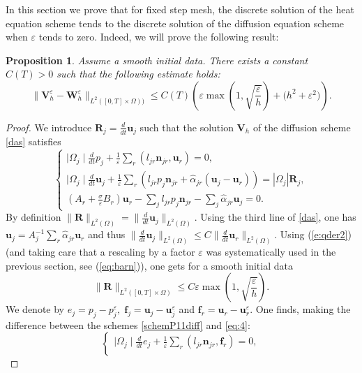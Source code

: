 \documentclass[a4paper,french,english,10pt]{article}
\newcommand\ljr{l_{jr}}
\newcommand\njr{\mathbf{n}_{jr}}
\newcommand\uu{\mathbf{u}}
\newcommand\si{\sigma}
\newcommand\eps{\varepsilon}
\newcommand{\ds}{\displaystyle}
\newcommand\alj{\widehat{\alpha}_{jr}}
\newcommand\uj{\uu_j}
\newcommand\ur{\uu_r}
\newcommand\fj{\mathbf{f}_j}
\newcommand\fr{\mathbf{f}_r}
\newcommand\V{\mathbf{V}}
\newtheorem{proposition}[theorem]{Proposition}
\begin{document}
In this section we prove that for fixed step mesh, the discrete
solution of the heat equation  scheme tends to the discrete solution of the diffusion
equation scheme when $\eps$ tends to zero. Indeed, we will prove the following result:
\begin{proposition}\label{jlbtodas}
Assume a smooth initial data.
There exists a constant $C(T)>0$ such that the following estimate holds:
\begin{equation} \label{eq:ww1}
\|\V_h^{\eps}-\mathbf W_h^\eps\|_{L^2([0,T] \times \Omega))} \leq
C(T)\left(\eps
\max\left(1,\sqrt{\frac{\eps} {h} }
\right)+ \big( h^2+\eps^2\big)\right).
\end{equation}
\end{proposition}
\begin{proof}
We introduce $\mathbf{R}_j= \frac{d}{dt} \mathbf u_j$  such that the solution $\V_h$ of the
diffusion scheme \eqref{das} satisfies
\begin{equation}\label{schemP11diff}
\left\{\begin{array}{l}
\ds \mid \Omega_j \mid\frac{d}{dt} p_j+\frac{1}{\eps}\sum_r(\ljr\njr,\ur)=0,\\
\ds \mid \Omega_j \mid\frac{d}{dt}\uj+\frac{1}{\eps}\sum_r(\ljr p_j\njr
+\alj(\uj-\ur)) =|\Omega_j| \mathbf{R}_j,\\
\ds \left(A_r+\frac{\si}{\eps}B_r\right) \ur-\sum_j\ljr
p_j\njr-\sum_j\alj  \uj=0 .
\end{array}\right.
\end{equation}
By definition $\|\mathbf{R}\|_{L^2(\Omega)}= \|\frac{d}{dt}
\uj\|_{L^2(\Omega)}$. Using the third line of \eqref{das}, one has
$\uj=A_j^{-1}\sum_r \alj\ur$ and thus $\|\frac{d}{dt}
\uj\|_{L^2(\Omega)}\leq C \|\frac{d}{dt} \ur\|_{L^2(\Omega)}$. 
Using
(\ref{e:qder2}) (and taking care
that a rescaling by a factor $\eps$
was systematically used
in the previous section, see (\ref{eq:barn})), one gets
for a smooth initial data
\begin{equation*}\label{dddd}
\|\mathbf{R}\|_{L^2([0,T]\times\Omega)}\leq C
\eps \max\left(1, \sqrt{\frac\eps h}   \right).
\end{equation*}
We denote by $e_j=p_j-p_j^{\eps}, \;
\fj =\uj-\uj^{\eps}$ and
$\fr =\ur-\ur^{\eps}$. One finds, making the
difference between the schemes \eqref{schemP11diff} and \eqref{eq:4}:
\begin{equation*}\label{schemP11diff2}
\left\{\begin{array}{l}
\ds \mid \Omega_j \mid\frac{d}{dt} e_j+\frac{1}{\eps}\sum_r(\ljr\njr,\fr )=0,\\

\end{array}
\end{equation*}
\end{proof}
\end{document}
